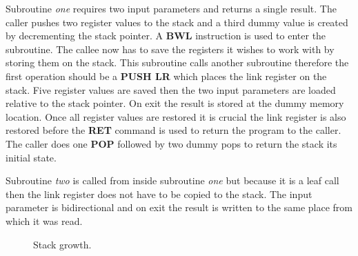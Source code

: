 Subroutine \emph{one} requires two input parameters and returns a single result.
The caller pushes two register values to the stack and a third dummy value is created by decrementing the stack pointer.
A \textbf{BWL} instruction is used to enter the subroutine.
The callee now has to save the registers it wishes to work with by storing them on the stack.
This subroutine calls another subroutine therefore the first operation should be a \textbf{PUSH LR} which places the link register on the stack.
Five register values are saved then the two input parameters are loaded relative to the stack pointer.
On exit the result is stored at the dummy memory location.
Once all register values are restored it is crucial the link register is also restored before the \textbf{RET} command is used to return the program to the caller. 
The caller does one \textbf{POP} followed by two dummy pops to return the stack its initial state.

Subroutine \emph{two} is called from inside subroutine \emph{one} but because it is a leaf call then the link register does not have to be copied to the stack.
The input parameter is bidirectional and on exit the result is written to the same place from which it was read.



\begin{figure}[!htb]
	\centering
	\caption{Stack growth.}
	\label{fig:stack}
\end{figure}




